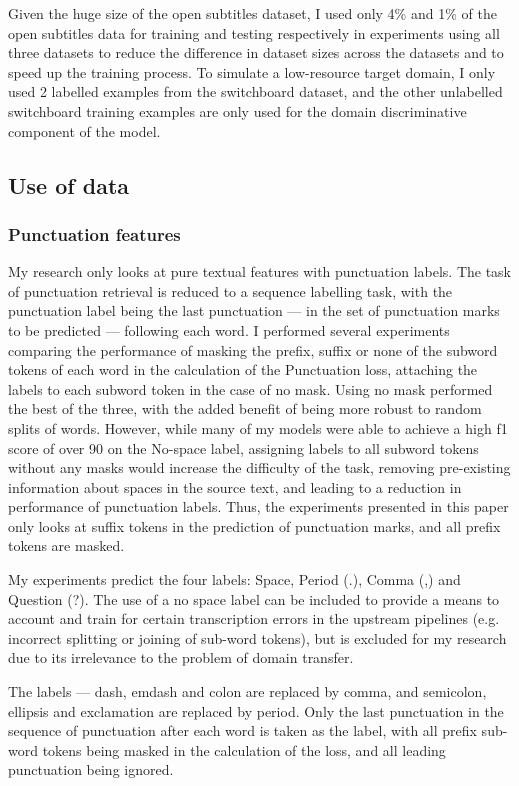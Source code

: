 \documentclass[a4paper]{article}
\begin{document}
\begin{multicols}{2}
 Given the huge size of the open subtitles dataset, I used only 4\% and 1\% of the open subtitles data for training and testing respectively in experiments using all three datasets to reduce the difference in dataset sizes across the datasets and to speed up the training process. To simulate a low-resource target domain, I only used 2 labelled examples from the switchboard dataset, and the other unlabelled switchboard training examples are only used for the domain discriminative component of the model.

\subsection{Use of data}
\subsubsection{Punctuation features}
My research only looks at pure textual features with punctuation labels. The task of punctuation retrieval is reduced to a sequence labelling task, with the punctuation label being the last punctuation --- in the set of punctuation marks to be predicted --- following each word. I performed several experiments comparing the performance of masking the prefix, suffix or none of the subword tokens of each word in the calculation of the Punctuation loss, attaching the labels to each subword token in the case of no mask. Using no mask performed the best of the three, with the added benefit of being more robust to random splits of words. However, while many of my models were able to achieve a high f1 score of over 90 on the No-space label, assigning labels to all subword tokens without any masks would increase the difficulty of the task, removing pre-existing information about spaces in the source text, and leading to a reduction in performance of punctuation labels. Thus, the experiments presented in this paper only looks at suffix tokens in the prediction of punctuation marks, and all prefix tokens are masked.

My experiments predict the four labels: Space, Period (.), Comma (,) and Question (?). The use of a no space label can be included to provide a means to account and train for certain transcription errors in the upstream pipelines (e.g. incorrect splitting or joining of sub-word tokens), but is excluded for my research due to its irrelevance to the problem of domain transfer. 

The labels --- dash, emdash and colon are replaced by comma, and semicolon, ellipsis and exclamation are replaced by period. Only the last punctuation in the sequence of punctuation after each word is taken as the label, with all prefix sub-word tokens being masked in the calculation of the loss, and all leading punctuation being ignored. 



\end{multicols}
\end{document}
